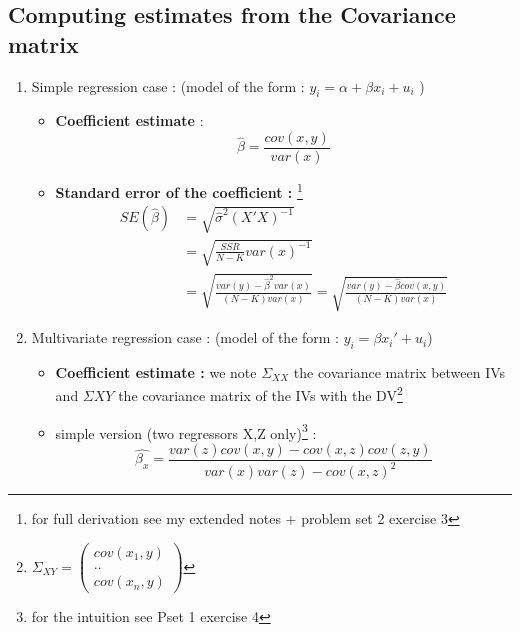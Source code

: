 \documentclass{article}
\begin{document}
\subsection{Computing estimates from the Covariance matrix}
\begin{nikibox}
    \begin{enumerate}
        \item Simple regression case : (model of the form : $y_i = \alpha + \beta x_i +u_i$ )
        \begin{itemize}
            \item \textbf{Coefficient estimate} : 
            \begin{equation}
                \hat{\beta}=\frac{cov(x,y)}{var(x)}
            \end{equation}
            \item \textbf{Standard error of the coefficient : }\footnote{for full derivation see my extended notes + problem set 2 exercise 3}
            \begin{equation}
            \begin{aligned}
        SE(\hat{\beta})&=\sqrt{\hat{\sigma}^2(X'X)^{-1}}\\
                &=\sqrt{\frac{SSR}{N-K}{var(x)^{-1}}} \\
                &= \sqrt{\frac{var(y) -\hat{\beta}^2var(x)}{(N-K)var(x)}} = \sqrt{\frac{var(y) -\hat{\beta}cov(x,y)}{(N-K)var(x)}}
            \end{aligned}
            \end{equation}
        \end{itemize}
        \item Multivariate regression case : (model of the form : $y_i=\beta x_i'+u_i$)
        \begin{itemize}
            \item \textbf{Coefficient estimate :} we note $\Sigma_{XX}$ the covariance matrix between IVs and $\Sigma{XY}$ the covariance matrix of the IVs with the DV\footnote{$\Sigma_{XY} = \begin{pmatrix}
                cov(x_1,y)\\..\\cov(x_n,y)
            \end{pmatrix}$}
            \item simple version (two regressors X,Z only)\footnote{for the intuition see Pset 1 exercise 4} :
            \begin{equation}
                \hat{\beta_x} = \frac{var(z)cov(x,y)-cov(x,z)cov(z,y)}{var(x)var(z)-cov(x,z)^2}

\end{equation}
\end{itemize}
\end{enumerate}
\end{nikibox}
\end{document}
